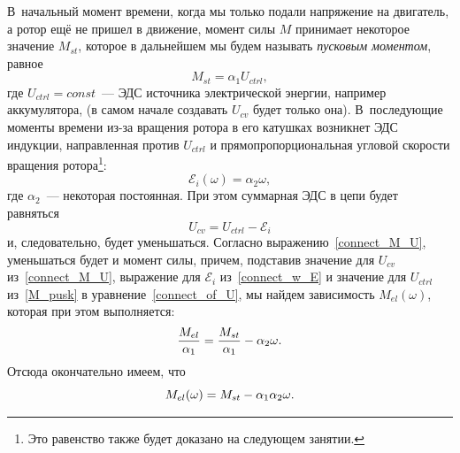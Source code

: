 \documentclass[12pt,a4paper,openany]{extarticle}
\begin{document}
В~начальный момент времени, когда мы только подали напряжение на двигатель, а ротор ещё не пришел в движение, момент силы $M$ принимает некоторое значение $M_{st}$, которое в дальнейшем мы будем называть {\itshape пусковым моментом}, равное 
\begin{equation}\label{M_pusk}
	M_{st}=\alpha_1U_{ctrl},
\end{equation}
где $U_{ctrl} = const$~--- ЭДС источника электрической энергии, например аккумулятора, (в самом начале создавать $U_{cv}$ будет только она).  
В~последующие моменты времени из-за вращения ротора в его катушках возникнет ЭДС индукции, направленная против $U_{ctrl}$ и прямопропорциональная угловой скорости вращения ротора\footnote{Это равенство также будет доказано на следующем занятии.}:
\begin{equation}\label{connect_w_E}
	\mathcal E_i(\omega)=\alpha_2\omega,
\end{equation}  
где $\alpha_2$~--- некоторая постоянная. 
При этом суммарная ЭДС в цепи будет равняться
\begin{equation}\label{connect_of_U}
	U_{cv}=U_{ctrl}-\mathcal E_i
\end{equation} 
и, следовательно, будет уменьшаться. 
Согласно выражению~\eqref{connect_M_U}, уменьшаться будет и момент силы, причем, подставив значение для $U_{cv}$ из~\eqref{connect_M_U}, выражение для $\mathcal E_i$ из~\eqref{connect_w_E} и значение для $U_{ctrl}$ из~\eqref{M_pusk} в уравнение~\eqref{connect_of_U}, мы найдем зависимость $M_{el}(\omega)$, которая при этом выполняется:
\begin{equation*}\label{bad_M(w)*}
	\frac{M_{el}}{\alpha_1}=\frac{M_{st}}{\alpha_1}-\alpha_2\omega\ldotp
\end{equation*}
Отсюда окончательно имеем, что
\begin{equation}\label{bad_M(w)}
	M_{el}(\omega)=M_{st}-\alpha_1\alpha_2\omega\ldotp
\end{equation}
\end{document}
